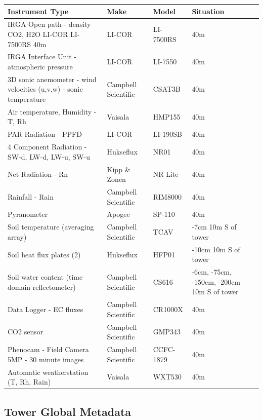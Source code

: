 \documentclass[11pt,a4paper]{article}
\begin{document}
\begin{longtable}{p{4.5cm}p{3.5cm}p{3.5cm}p{3.5cm}}
\toprule
\textbf{Instrument Type} & \textbf{Make} & \textbf{Model} & \textbf{Situation} \\
\midrule
\endhead
\bottomrule
\endfoot
IRGA Open path                  - density CO2, H2O  LI-COR LI-7500RS 40m & LI-COR & LI-7500RS & 40m \\
IRGA Interface Unit                 - atmospheric pressure & LI-COR & LI-7550 & 40m \\
3D sonic anemometer                 - wind velocities (u,v,w)                  - sonic   temperature & Campbell Scientific & CSAT3B & 40m \\
Air temperature, Humidity                  - T, Rh & Vaisala & HMP155 & 40m \\
PAR Radiation                  - PPFD & LI-COR & LI-190SB & 40m \\
4 Component Radiation                - SW-d, LW-d, LW-u, SW-u & Hukseflux & NR01 & 40m \\
Net Radiation               - Rn & Kipp \& Zonen & NR Lite & 40m \\
Rainfall                 - Rain & Campbell Scientific & RIM8000 & 40m \\
Pyranometer & Apogee & SP-110 & 40m \\
Soil temperature                  (averaging array) & Campbell Scientific & TCAV & -7cm                 10m S of tower \\
Soil heat flux plates (2) & Hukseflux & HFP01 & -10cm                  10m S of tower \\
Soil water content                (time  domain reflectometer) & Campbell Scientific & CS616 & -6cm, -75cm,                 -150cm, -200cm                                  10m S of tower \\
Data Logger                 - EC fluxes & Campbell Scientific & CR1000X & 40m \\
CO2 sensor & Campbell Scientific & GMP343 & 40m \\
Phenocam - Field Camera 5MP                 - 30 minute images & Campbell Scientific & CCFC-1879 & 40m \\
Automatic weatherstation                 (T, Rh, Rain) & Vaisala & WXT530 & 40m \\
\end{longtable}


\subsection*{Tower Global Metadata}
\end{document}
